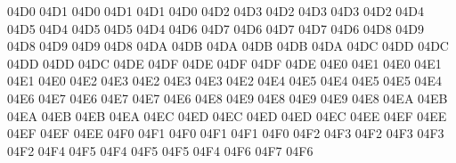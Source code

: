 \setcclcuc 04D0 04D1 04D0 %
\setcclcuc 04D1 04D1 04D0 %
\setcclcuc 04D2 04D3 04D2 %
\setcclcuc 04D3 04D3 04D2 %
\setcclcuc 04D4 04D5 04D4 %
\setcclcuc 04D5 04D5 04D4 %
\setcclcuc 04D6 04D7 04D6 %
\setcclcuc 04D7 04D7 04D6 %
\setcclcuc 04D8 04D9 04D8 %
\setcclcuc 04D9 04D9 04D8 %
\setcclcuc 04DA 04DB 04DA %
\setcclcuc 04DB 04DB 04DA %
\setcclcuc 04DC 04DD 04DC %
\setcclcuc 04DD 04DD 04DC %
\setcclcuc 04DE 04DF 04DE %
\setcclcuc 04DF 04DF 04DE %
\setcclcuc 04E0 04E1 04E0 %
\setcclcuc 04E1 04E1 04E0 %
\setcclcuc 04E2 04E3 04E2 %
\setcclcuc 04E3 04E3 04E2 %
\setcclcuc 04E4 04E5 04E4 %
\setcclcuc 04E5 04E5 04E4 %
\setcclcuc 04E6 04E7 04E6 %
\setcclcuc 04E7 04E7 04E6 %
\setcclcuc 04E8 04E9 04E8 %
\setcclcuc 04E9 04E9 04E8 %
\setcclcuc 04EA 04EB 04EA %
\setcclcuc 04EB 04EB 04EA %
\setcclcuc 04EC 04ED 04EC %
\setcclcuc 04ED 04ED 04EC %
\setcclcuc 04EE 04EF 04EE %
\setcclcuc 04EF 04EF 04EE %
\setcclcuc 04F0 04F1 04F0 %
\setcclcuc 04F1 04F1 04F0 %
\setcclcuc 04F2 04F3 04F2 %
\setcclcuc 04F3 04F3 04F2 %
\setcclcuc 04F4 04F5 04F4 %
\setcclcuc 04F5 04F5 04F4 %
\setcclcuc 04F6 04F7 04F6 %
